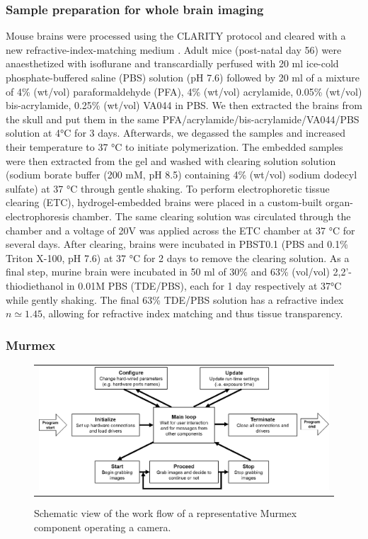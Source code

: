 \documentclass[12pt]{spieman}  %
\begin{document}
\subsubsection{Sample preparation for whole brain imaging}
Mouse brains were processed using the CLARITY protocol \cite{Chung2013} and cleared with a new refractive-index-matching medium \cite{Costantini}. Adult mice (post-natal day 56) were anaesthetized with isoflurane and transcardially perfused with 20 ml ice-cold phosphate-buffered saline (PBS) solution (pH 7.6) followed by 20 ml of a mixture of 4\% (wt/vol) paraformaldehyde (PFA), 4\% (wt/vol) acrylamide, 0.05\% (wt/vol) bis-acrylamide, 0.25\% (wt/vol) VA044 in PBS. We then extracted the brains from the skull and put them in the same PFA/acrylamide/bis-acrylamide/VA044/PBS solution at 4°C for 3 days. Afterwards, we degassed the samples and increased their temperature to 37 °C to initiate polymerization. The embedded samples were then extracted from the gel and washed with clearing solution solution (sodium borate buffer (200 mM, pH 8.5) containing 4\% (wt/vol) sodium dodecyl sulfate) at 37 °C through gentle shaking. To perform electrophoretic tissue clearing (ETC), hydrogel-embedded brains were placed in a custom-built organ-electrophoresis chamber. The same clearing solution was circulated through the chamber and a voltage of 20V was applied across the ETC chamber at 37 °C for several days. After clearing, brains were incubated in PBST0.1 (PBS and 0.1\% Triton X-100, pH 7.6) at 37 °C for 2 days to remove the clearing solution. As a final step, murine brain were incubated in 50 ml of 30\% and 63\% (vol/vol) 2,2'-thiodiethanol in 0.01M PBS (TDE/PBS), each for 1 day respectively at 37°C while gently shaking. The final 63\% TDE/PBS solution has a refractive index $n\simeq 1.45$, allowing for refractive index matching and thus tissue transparency.



\subsubsection{Murmex}
\label{sec:murmex}
	\begin{figure}
   \begin{center}
   \begin{tabular}{c}
   \includegraphics[width=\textwidth]{murmex.eps}
   \end{tabular}
   \end{center}
   \caption{\label{fig:murmex} Schematic view of the work flow of a representative Murmex component operating a camera.} 
   \end{figure}
\end{document}
